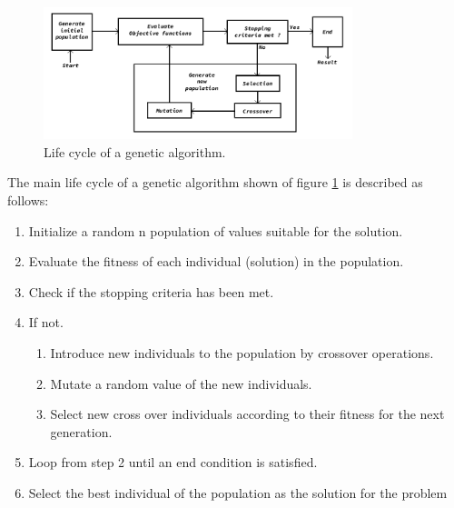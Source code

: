\documentclass[conference]{IEEEtran}
\begin{document}
\begin{figure}[htbp]
\centerline{\includegraphics[width=90mm]{Images/ga_life_cycle.png}}
\caption{Life cycle of a genetic algorithm.}
\label{algorithm_model}
\end{figure}

The main life cycle of a genetic algorithm shown of figure \ref{algorithm_model}
is described as follows:
\begin{enumerate}
    \item Initialize a random n population of values suitable for the solution.
    \item Evaluate the fitness of each individual (solution) in the population.
    \item Check if the stopping criteria has been met.
    \item If not.
    \begin{enumerate}
        \item Introduce new individuals to the population by crossover
        operations.
        \item Mutate a random value of the new individuals.
        \item Select new cross over individuals according to their fitness for
        the next generation.
    \end{enumerate}
    \item Loop from step 2 until an end condition is satisfied.
    \item Select the best individual of the population as the solution for the
    problem
\end{enumerate}


\end{document}
